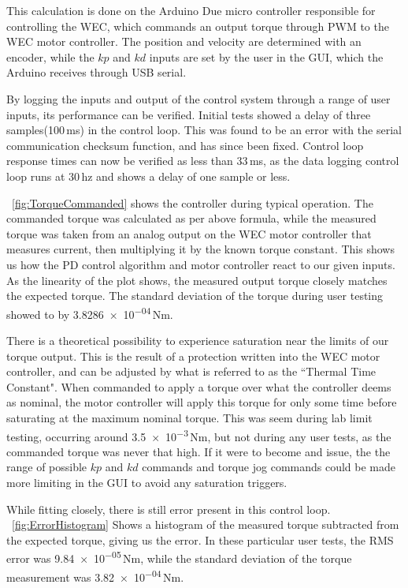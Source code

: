 \documentclass[11pt, letterpaper]{article}
\begin{document}
\begin{itemize}
This calculation is done on the Arduino Due micro controller responsible for controlling the WEC, which commands an output torque through PWM to the WEC motor controller.
The position and velocity are determined with an encoder, while the $kp$ and $kd$ inputs are set by the user in the GUI, which the Arduino receives through USB serial.

By logging the inputs and output of the control system through a range of user inputs, its performance can be verified.
Initial tests showed a delay of three samples(100\,ms) in the control loop.
This was found to be an error with the serial communication checksum function, and has since been fixed.
Control loop response times can now be verified as less than 33\,ms, as the data logging control loop runs at 30\,hz and shows a delay of one sample or less.

\figurename~\ref{fig:TorqueCommanded} shows the controller during typical operation. 
The commanded torque was calculated as per above formula, while the measured torque was taken from an analog output on the WEC motor controller that measures current, then multiplying it by the known torque constant.
This shows us how the PD control algorithm and motor controller react to our given inputs.
As the linearity of the plot shows, the measured output torque closely matches the expected torque.
The standard deviation of the torque during user testing showed to by \num{3.8286e-04}\,Nm.


There is a theoretical possibility to experience saturation near the limits of our torque output.
This is the result of a protection written into the WEC motor controller, and can be adjusted by what is referred to as the ``Thermal Time Constant".
When commanded to apply a torque over what the controller deems as nominal, the motor controller will apply this torque for only some time before saturating at the maximum nominal torque.
This was seem during lab limit testing, occurring around  \num{3.5e-3}\,Nm, but not during any user tests, as the commanded torque was never that high.
If it were to become and issue, the the range of possible $kp$ and $kd$ commands and torque jog commands could be made more limiting in the GUI to avoid any saturation triggers.

While fitting closely, there is still error present in this control loop. 
 \figurename~\ref{fig:ErrorHistogram} Shows a histogram of the measured torque subtracted from the expected torque, giving us the error.
In these particular user tests, the RMS error was \num{9.84e-05}\,Nm, while the standard deviation of the torque measurement was \num{3.82e-04}\,Nm.


\end{itemize}
\end{document}
